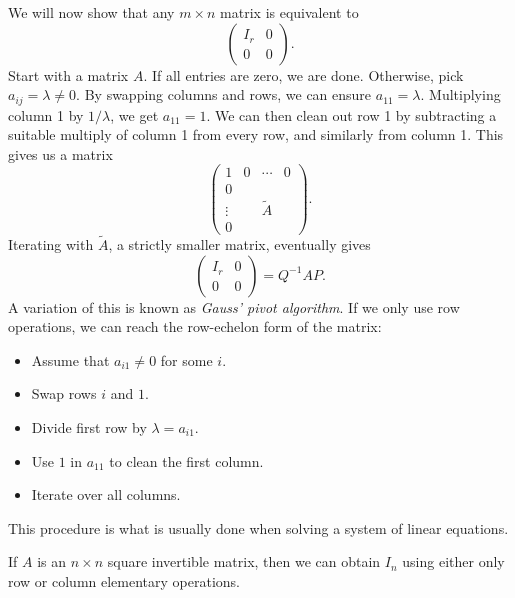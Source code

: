 \documentclass[12pt]{article}
\begin{document}
We will now show that any $m \times n$ matrix is equivalent to
\[
\begin{pmatrix}
	I_r & 0 \\
	0 & 0
\end{pmatrix}
.\]
Start with a matrix $A$. If all entries are zero, we are done. Otherwise, pick $a_{ij} = \lambda \neq 0$. By swapping columns and rows, we can ensure $a_{11} = \lambda$. Multiplying column 1 by $1/\lambda$, we get $a_{11} = 1$. We can then clean out row 1 by subtracting a suitable multiply of column 1 from every row, and similarly from column 1. This gives us a matrix
\[
\begin{pmatrix}
	1 & 0 & \cdots & 0 \\
	0 & & & \\
	\vdots & & \tilde A & \\
	0 & & &
\end{pmatrix}
.\]
Iterating with $\tilde A$, a strictly smaller matrix, eventually gives
\[
\begin{pmatrix}
	I_r & 0 \\
	0 & 0
\end{pmatrix} = Q^{-1}AP
.\]
A variation of this is known as \textit{Gauss' pivot algorithm}. If we only use row operations, we can reach the row-echelon form of the matrix:
\begin{itemize}
	\item Assume that $a_{i1} \neq 0$ for some $i$.
	\item Swap rows $i$ and $1$.
	\item Divide first row by $\lambda = a_{i1}$.
	\item Use $1$ in $a_{11}$ to clean the first column.
	\item Iterate over all columns.
\end{itemize}
This procedure is what is usually done when solving a system of linear equations.

\begin{lemma}
	If $A$ is an $n \times n$ square invertible matrix, then we can obtain $I_n$ using either only row or column elementary operations.
\end{lemma}
\end{document}
